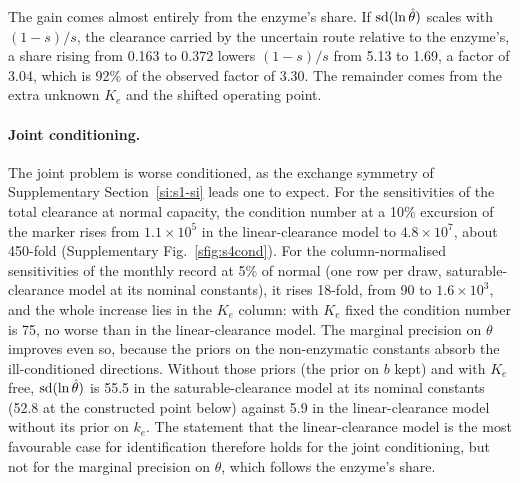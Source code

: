 The gain comes almost entirely from the enzyme's share. If $\operatorname{sd}(\ln \hat\theta)$ scales with
$(1-s)/s$, the clearance carried by the uncertain route relative to the enzyme's, a share rising
from 0.163 to 0.372 lowers $(1-s)/s$ from 5.13 to 1.69, a factor of 3.04, which is 92\% of the
observed factor of 3.30. The remainder comes from the extra unknown $K_e$ and the shifted
operating point.

\paragraph{Joint conditioning.} The joint problem is worse conditioned, as the exchange symmetry
of Supplementary Section~\ref{si:s1-si} leads one to expect. For the sensitivities of the total
clearance at normal capacity, the condition number at a 10\% excursion of the marker rises from
$1.1\times10^5$ in the linear-clearance model to $4.8\times10^7$, about 450-fold
(Supplementary Fig.~\ref{sfig:s4cond}). For the column-normalised sensitivities of the monthly
record at 5\% of normal (one row per draw, saturable-clearance model at its nominal constants),
it rises 18-fold, from 90 to $1.6\times10^3$, and the whole increase lies in the $K_e$ column:
with $K_e$ fixed the condition number is 75, no worse than in the linear-clearance model. The
marginal precision on $\theta$ improves even so, because the priors on the non-enzymatic
constants absorb the ill-conditioned directions. Without those priors (the prior on $b$ kept)
and with $K_e$ free, $\operatorname{sd}(\ln \hat\theta)$ is 55.5 in the saturable-clearance model at its nominal
constants (52.8 at the constructed point below) against 5.9 in the linear-clearance model
without its prior on $k_e$. The statement that the linear-clearance
model is the most favourable case for identification therefore holds for the joint
conditioning, but not for the marginal precision on $\theta$, which follows the enzyme's share.

